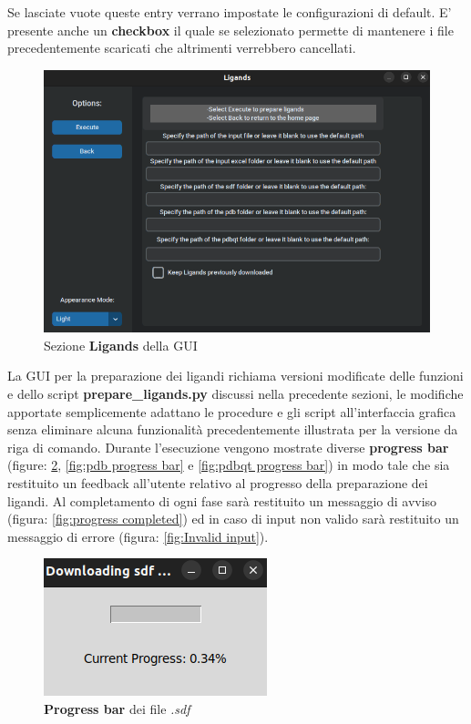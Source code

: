 Se lasciate vuote queste entry verrano impostate le configurazioni di default. E' presente anche un \textbf{checkbox} il quale se selezionato permette di mantenere i file precedentemente scaricati che altrimenti verrebbero cancellati.\newline

\begin{figure}[H]
    \centering
    \includegraphics[scale=0.6]{immagini/ligands.png}
    \caption{Sezione \textbf{Ligands} della GUI}
    \label{fig:ligands}
\end{figure}

La GUI per la preparazione dei ligandi richiama versioni modificate delle funzioni e dello script \textbf{prepare\_ligands.py} discussi nella precedente sezioni, le modifiche apportate semplicemente adattano le procedure e gli script all'interfaccia grafica senza eliminare alcuna funzionalità precedentemente illustrata per la versione da riga di comando.\newline
Durante l'esecuzione vengono mostrate diverse  \textbf{progress bar} (figure: \ref{fig:sdf progress bar}, \ref{fig:pdb progress bar} e \ref{fig:pdbqt progress bar}) in modo tale che sia restituito un feedback all'utente relativo al progresso della preparazione dei ligandi. Al completamento di ogni fase sarà restituito un messaggio di avviso (figura: \ref{fig:progress completed}) ed in caso di input non valido sarà restituito un messaggio di errore (figura: \ref{fig:Invalid input}).

\begin{figure}[H]
    \centering
    \includegraphics{immagini/sdfProgressBar.png}
    \caption{\textbf{Progress bar} dei file \textit{.sdf}}
    \label{fig:sdf progress bar}
\end{figure}

